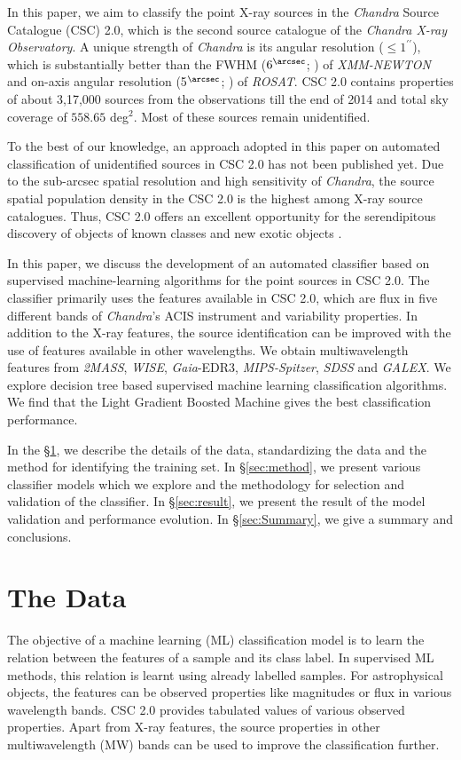 \documentclass[fleqn,usenatbib]{mnras}
\begin{document}
In this paper, we aim to classify the point X-ray sources in the {\em Chandra} Source Catalogue (CSC) 2.0, which is the second source catalogue \citep{2020AAS...23515405E} of the {\em Chandra X-ray Observatory}. A unique strength of {\em Chandra} is its angular resolution ($\leq 1^{\prime \prime}$), which is substantially better than the FWHM ($6^{\arcsec}$; \cite{2001A&A...365L...1J}) of {\em XMM-NEWTON} and on-axis angular resolution (5$^{\arcsec}$; \cite{1982AdSpR...2d.251A}) of {\em ROSAT}. CSC 2.0 contains properties of about 3,17,000 sources from the observations till the end of 2014 and total sky coverage of $558.65$ deg$^2$. Most of these sources remain unidentified. 

To the best of our knowledge, an approach adopted in this paper on
automated classification of unidentified sources in CSC 2.0 has
not been published yet. Due to the sub-arcsec spatial resolution and high sensitivity of \textit{Chandra}, the source spatial population density in the CSC 2.0 is the highest among X-ray source catalogues. Thus, CSC 2.0 offers an excellent opportunity for the serendipitous discovery of objects of known classes and new exotic objects \citep{2019HEAD...1710929M}. 

In this paper, we discuss the development of an automated classifier based on supervised machine-learning algorithms for the point sources in CSC 2.0. The classifier primarily uses the features available in CSC 2.0, which are flux in five different bands of {\em Chandra}'s ACIS instrument and variability properties. In addition to the X-ray features, the source identification can be improved with the use of features available in other wavelengths. We obtain multiwavelength features from {\em 2MASS}, {\em WISE}, {\em Gaia}-EDR3, {\em MIPS-Spitzer}, {\em SDSS} and {\em GALEX}. We explore decision tree based supervised machine learning classification algorithms. We find that the Light Gradient Boosted Machine gives the best classification performance. 

In the \S \ref{sec:data-source}, we describe the details of the data, standardizing the data and the method for identifying the training set. In \S \ref{sec:method}, we present various classifier models which we explore and the methodology for selection and validation of the classifier. In \S \ref{sec:result}, we present the result of the model validation and performance evolution. 
In \S \ref{sec:Summary}, we give a summary and conclusions.

\section{The Data}\label{sec:data-source}
The objective of a machine learning (ML) classification model is to learn the relation between the features of a sample and its class label. In supervised ML methods, this relation is learnt using already labelled samples. For astrophysical objects, the features can be observed properties like magnitudes or flux in various wavelength bands. CSC 2.0 provides tabulated values of various  observed properties. Apart from X-ray features, the source properties in other multiwavelength (MW) bands can be used to improve the classification further.
\end{document}
